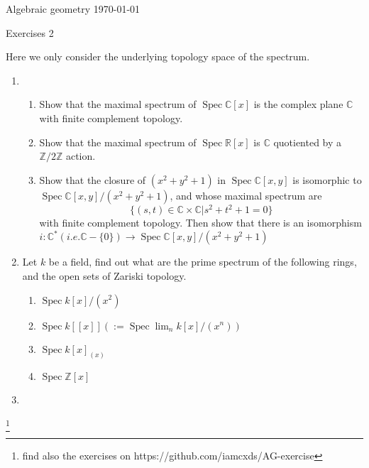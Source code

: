 \documentclass[a4paper,11pt]{article}
\def\bb#1{\mathbb{#1}}
\def\bZ{\mathbb{Z}}
\def\Zmd#1{\bZ/#1\bZ}
\DeclareMathOperator{\Spec}{Spec}
\begin{document}
{\small Algebraic geometry \hfill \today \\}
\begin{center}
\Huge Exercises 2
\end{center}

\vskip0.6cm
Here we only consider the underlying topology space of the spectrum.
\begin{enumerate}[1.]
\item 
\begin{enumerate}
    \item Show that the maximal spectrum of $\Spec\bb{C}[x]$ is the complex plane $\bb{C}$ with finite complement topology.
    \item Show that the maximal spectrum of $\Spec \bb{R}[x]$ is $\bb{C}$ quotiented by a $\Zmd{2}$ action.
    \item Show that the closure of $(x^2+y^2+1)$ in $\Spec \bb{C}[x,y]$ is isomorphic to $\Spec \bb{C}[x,y]/(x^2+y^2+1)$, and whose maximal spectrum are \[\{(s,t)\in \bb{C}\times\bb{C}|s^2+t^2+1=0\}\] with finite complement topology. Then show that there is an isomorphism $i: \bb{C}^*(i.e.\bb{C}-
    \{0\})\to \Spec \bb{C}[x,y]/(x^2+y^2+1)$
\end{enumerate}
\item Let $k$ be a field, find out what are the prime spectrum of the following rings, and the open sets of Zariski topology.
\begin{enumerate}
    \item  $\Spec k[x]/(x^2)$
    \item  $\Spec k[[x]](:=\Spec \lim_n k[x]/(x^n))$
    \item  $\Spec k[x]_{(x)}$
    \item  $\Spec \bZ[x]$
\end{enumerate}
\item 




\end{enumerate}
\footnote{find also the exercises on https://github.com/iamcxds/AG-exercise}
\end{document}
